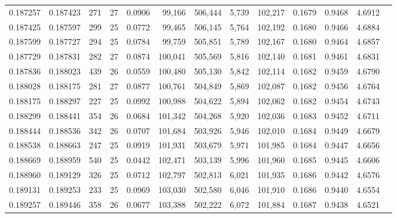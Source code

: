 \begin{tabular}{rrrrrrrrrrrrr}
0.187257 & 0.187423 &   271 &  27 &                                     0.0906 &  99,166 & 506,444 &   5,739 & 102,217 & 0.1679 & 0.9468 & 4.6912 \\
0.187425 & 0.187597 &   299 &  25 &                                     0.0772 &  99,465 & 506,145 &   5,764 & 102,192 & 0.1680 & 0.9466 & 4.6884 \\
0.187599 & 0.187727 &   294 &  25 &                                     0.0784 &  99,759 & 505,851 &   5,789 & 102,167 & 0.1680 & 0.9464 & 4.6857 \\
0.187729 & 0.187831 &   282 &  27 &                                     0.0874 & 100,041 & 505,569 &   5,816 & 102,140 & 0.1681 & 0.9461 & 4.6831 \\
0.187836 & 0.188023 &   439 &  26 &                                     0.0559 & 100,480 & 505,130 &   5,842 & 102,114 & 0.1682 & 0.9459 & 4.6790 \\
0.188028 & 0.188175 &   281 &  27 &                                     0.0877 & 100,761 & 504,849 &   5,869 & 102,087 & 0.1682 & 0.9456 & 4.6764 \\
0.188175 & 0.188297 &   227 &  25 &                                     0.0992 & 100,988 & 504,622 &   5,894 & 102,062 & 0.1682 & 0.9454 & 4.6743 \\
0.188299 & 0.188441 &   354 &  26 &                                     0.0684 & 101,342 & 504,268 &   5,920 & 102,036 & 0.1683 & 0.9452 & 4.6711 \\
0.188444 & 0.188536 &   342 &  26 &                                     0.0707 & 101,684 & 503,926 &   5,946 & 102,010 & 0.1684 & 0.9449 & 4.6679 \\
0.188538 & 0.188663 &   247 &  25 &                                     0.0919 & 101,931 & 503,679 &   5,971 & 101,985 & 0.1684 & 0.9447 & 4.6656 \\
0.188669 & 0.188959 &   540 &  25 &                                     0.0442 & 102,471 & 503,139 &   5,996 & 101,960 & 0.1685 & 0.9445 & 4.6606 \\
0.188960 & 0.189129 &   326 &  25 &                                     0.0712 & 102,797 & 502,813 &   6,021 & 101,935 & 0.1686 & 0.9442 & 4.6576 \\
0.189131 & 0.189253 &   233 &  25 &                                     0.0969 & 103,030 & 502,580 &   6,046 & 101,910 & 0.1686 & 0.9440 & 4.6554 \\
0.189257 & 0.189446 &   358 &  26 &                                     0.0677 & 103,388 & 502,222 &   6,072 & 101,884 & 0.1687 & 0.9438 & 4.6521 \\

\end{tabular}
